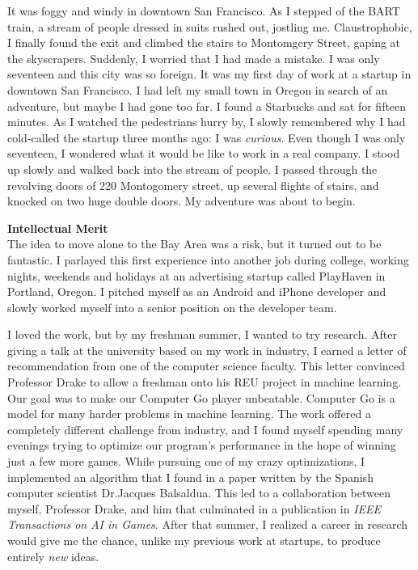 \documentclass[12pt]{article}
\title{}
\begin{document}
It was foggy and windy in downtown San Francisco. As I stepped of the BART train, a stream of people dressed in suits rushed out, jostling me. Claustrophobic, I finally found the exit and climbed the stairs to Montomgery Street, gaping at the skyscrapers. Suddenly, I worried that I had made a mistake. I was only seventeen and this city was so foreign. It was my first day of work at a startup in downtown San Francisco. I had left my small town in Oregon in search of an adventure, but maybe I had gone too far. I found a Starbucks and sat for fifteen minutes. As I watched the pedestrians hurry by, I slowly remembered why I had cold-called the startup three months ago: I was \textit{curious}. Even though I was only seventeen, I wondered what it would be like to work in a real company. I stood up slowly and walked back into the stream of people. I passed through the revolving doors of 220 Montogomery street, up several flights of stairs, and knocked on two huge double doors. My adventure was about to begin.

\textbf{Intellectual Merit}\\
The idea to move alone to the Bay Area was a risk, but it turned out to be fantastic. I parlayed this first experience into another job during college, working nights, weekends and holidays at an advertising startup called PlayHaven in Portland, Oregon. I pitched myself as an Android and iPhone developer and slowly worked myself into a senior position on the developer team. 

I loved the work, but by my freshman summer, I wanted to try research. After giving a talk at the university based on my work in industry, I earned a letter of recommendation from one of the computer science faculty. This letter convinced Professor Drake to allow a freshman onto his REU project in machine learning. Our goal was to make our Computer Go player unbeatable. Computer Go is a model for many harder problems in machine learning. The work offered a completely different challenge from industry, and I found myself spending many evenings trying to optimize our program's performance in the hope of winning just a few more games. While pursuing one of my crazy optimizations, I implemented an algorithm that I found in a paper written by the Spanish computer scientist Dr.\thinspace Jacques Balsaldua. This led to a collaboration between myself, Professor Drake, and him that culminated in a publication in \textit{IEEE Transactions on AI in Games}. After that summer, I realized a career in research would give me the chance, unlike my previous work at startups, to produce entirely \textit{new} ideas.
\end{document}
